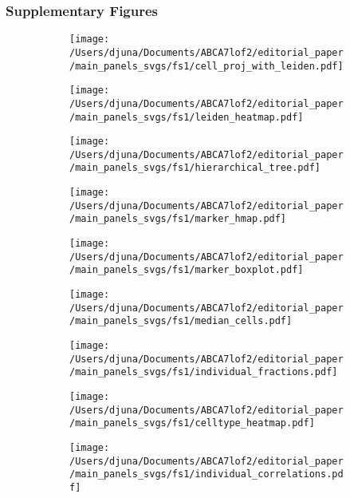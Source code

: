 % 
% 
\subsubsection*{Supplementary Figures}
{}

\begin{figure}[H]
    \begin{subfigure}[t]{.2\textwidth}
        \caption{}
        \texttt{[image: /Users/djuna/Documents/ABCA7lof2/editorial\_paper/main\_panels\_svgs/fs1/cell\_proj\_with\_leiden.pdf]}        
    \end{subfigure}
    \begin{subfigure}[t]{.2\textwidth}
        \caption{}
        \texttt{[image: /Users/djuna/Documents/ABCA7lof2/editorial\_paper/main\_panels\_svgs/fs1/leiden\_heatmap.pdf]}        
    \end{subfigure}   
    \begin{subfigure}[t]{.2\textwidth}
        \caption{}
        \texttt{[image: /Users/djuna/Documents/ABCA7lof2/editorial\_paper/main\_panels\_svgs/fs1/hierarchical\_tree.pdf]}        
    \end{subfigure}  
    \begin{subfigure}[t]{.3\textwidth}
        \caption{}
        \texttt{[image: /Users/djuna/Documents/ABCA7lof2/editorial\_paper/main\_panels\_svgs/fs1/marker\_hmap.pdf]}        
    \end{subfigure}  
    \begin{subfigure}[t]{.8\textwidth}
        \caption{}
        \texttt{[image: /Users/djuna/Documents/ABCA7lof2/editorial\_paper/main\_panels\_svgs/fs1/marker\_boxplot.pdf]}        
    \end{subfigure}    
    \begin{subfigure}[t]{.2\textwidth}
        \caption{}
        \texttt{[image: /Users/djuna/Documents/ABCA7lof2/editorial\_paper/main\_panels\_svgs/fs1/median\_cells.pdf]}        
    \end{subfigure} 
    \begin{subfigure}[t]{.8\textwidth}
        \caption{}
        \texttt{[image: /Users/djuna/Documents/ABCA7lof2/editorial\_paper/main\_panels\_svgs/fs1/individual\_fractions.pdf]}        
    \end{subfigure}  
    \begin{subfigure}[t]{.4\textwidth}
        \caption{}
        \texttt{[image: /Users/djuna/Documents/ABCA7lof2/editorial\_paper/main\_panels\_svgs/fs1/celltype\_heatmap.pdf]}        
    \end{subfigure}  
    \begin{subfigure}[t]{.2\textwidth}
        \caption{}
        \texttt{[image: /Users/djuna/Documents/ABCA7lof2/editorial\_paper/main\_panels\_svgs/fs1/individual\_correlations.pdf]}        
    \end{subfigure}
    \end{figure}


